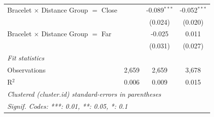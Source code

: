 \begin{tabular}{lccc}
   Bracelet $\times$ Distance Group $=$ Close  &               & -0.089$^{***}$           & -0.052$^{***}$\\   
                                               &               & (0.024)                  & (0.020)\\   
   Bracelet $\times$ Distance Group $=$ Far    &               & -0.025                   & 0.011\\   
                                               &               & (0.031)                  & (0.027)\\   
   \midrule
   \emph{Fit statistics}\\
   Observations                                & 2,659         & 2,659                    & 3,678\\  
   R$^2$                                       & 0.006         & 0.009                    & 0.015\\  
   \midrule \midrule
   \multicolumn{4}{l}{\emph{Clustered (cluster.id) standard-errors in parentheses}}\\
   \multicolumn{4}{l}{\emph{Signif. Codes: ***: 0.01, **: 0.05, *: 0.1}}\\
\end{tabular}


